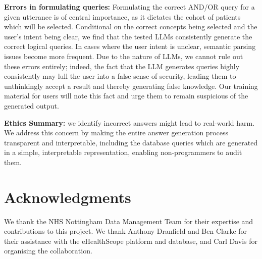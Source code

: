 \documentclass[11pt]{article}
\begin{document}
\textbf{Errors in formulating queries:}
Formulating the correct AND/OR query for a given utterance is of central importance, as it dictates the cohort of patients which will be selected.
Conditional on the correct concepts being selected and the user's intent being clear, we find that the tested LLMs consistently generate the correct logical queries.
In cases where the user intent is unclear, semantic parsing issues become more frequent. Due to the nature of LLMs, we cannot rule out these errors entirely; indeed, the fact that the LLM generates queries highly consistently may lull the user into a false sense of security, leading them to unthinkingly accept a result and thereby generating false knowledge. Our training material for users will note this fact and urge them to remain suspicious of the generated output.

\textbf{Ethics Summary:} we identify incorrect answers might lead to real-world harm. We address this concern by making the entire answer generation process transparent and interpretable, including the database queries which are generated in a simple, interpretable representation, enabling non-programmers to audit them.


\section*{Acknowledgments}
We thank the NHS Nottingham Data Management Team for their expertise and contributions to this project. We thank Anthony Dranfield and Ben Clarke for their assistance with the eHealthScope platform and database, and Carl Davis for organising the collaboration.



\appendix

\end{document}
